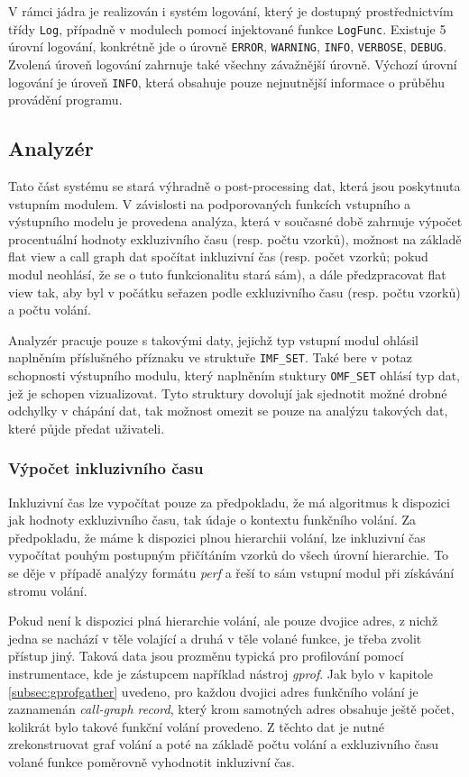 \documentclass[czech,BP]{thesiskiv}
\begin{document}
V rámci jádra je realizován i systém logování, který je dostupný prostřednictvím třídy \texttt{Log}, případně v modulech pomocí injektované funkce \texttt{LogFunc}. Existuje 5 úrovní logování, konkrétně jde o úrovně \texttt{ERROR}, \texttt{WARNING}, \texttt{INFO}, \texttt{VERBOSE}, \texttt{DEBUG}. Zvolená úroveň logování zahrnuje také všechny závažnější úrovně. Výchozí úrovní logování je úroveň \texttt{INFO}, která obsahuje pouze nejnutnější informace o průběhu provádění programu.

\subsection{Analyzér}\label{subsec:analyzer}

Tato část systému se stará výhradně o post-processing dat, která jsou poskytnuta vstupním modulem. V závislosti na podporovaných funkcích vstupního a výstupního modelu je provedena analýza, která v současné době zahrnuje výpočet procentuální hodnoty exkluzivního času (resp. počtu vzorků), možnost na základě flat view a call graph dat spočítat inkluzivní čas (resp. počet vzorků; pokud modul neohlásí, že se o tuto funkcionalitu stará sám), a dále předzpracovat flat view tak, aby byl v počátku seřazen podle exkluzivního času (resp. počtu vzorků) a počtu volání.

Analyzér pracuje pouze s takovými daty, jejichž typ vstupní modul ohlásil naplněním příslušného příznaku ve struktuře \texttt{IMF\_SET}. Také bere v potaz schopnosti výstupního modulu, který naplněním stuktury \texttt{OMF\_SET} ohlásí typ dat, jež je schopen vizualizovat. Tyto struktury dovolují jak sjednotit možné drobné odchylky v chápání dat, tak možnost omezit se pouze na analýzu takových dat, které půjde předat uživateli.

\subsubsection*{Výpočet inkluzivního času}

Inkluzivní čas lze vypočítat pouze za předpokladu, že má algoritmus k dispozici jak hodnoty exkluzivního času, tak údaje o kontextu funkčního volání. Za předpokladu, že máme k dispozici plnou hierarchii volání, lze inkluzivní čas vypočítat pouhým postupným přičítáním vzorků do všech úrovní hierarchie. To se děje v případě analýzy formátu \emph{perf} a řeší to sám vstupní modul při získávání stromu volání.

Pokud není k dispozici plná hierarchie volání, ale pouze dvojice adres, z nichž jedna se nachází v těle volající a druhá v těle volané funkce, je třeba zvolit přístup jiný. Taková data jsou prozměnu typická pro profilování pomocí instrumentace, kde je zástupcem například nástroj \emph{gprof}. Jak bylo v kapitole \ref{subsec:gprofgather} uvedeno, pro každou dvojici adres funkčního volání je zaznamenán \emph{call-graph record}, který krom samotných adres obsahuje ještě počet, kolikrát bylo takové funkční volání provedeno. Z těchto dat je nutné zrekonstruovat graf volání a poté na základě počtu volání a exkluzivního času volané funkce poměrovně vyhodnotit inkluzivní čas.
\end{document}
